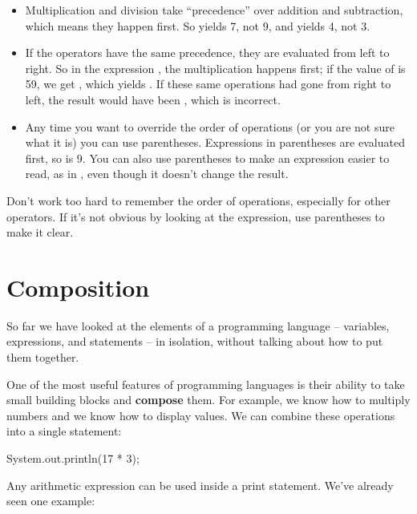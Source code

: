 \begin{itemize}

\item Multiplication and division take ``precedence'' over addition and subtraction, which means they happen first.
So  yields 7, not 9, and  yields 4, not 3.

\item If the operators have the same precedence, they are evaluated from left to right.
So in the expression , the multiplication happens first; if the value of  is 59, we get , which yields .
If these same operations had gone from right to left, the result would have been , which is incorrect.

\item Any time you want to override the order of operations (or you are not sure what it is) you can use parentheses.
Expressions in parentheses are evaluated first, so  is 9.
You can also use parentheses to make an expression easier to read, as in , even though it doesn't change the result.

\end{itemize}

Don't work too hard to remember the order of operations, especially for other operators.
If it's not obvious by looking at the expression, use parentheses to make it clear.


\section{Composition}


So far we have looked at the elements of a programming language -- variables, expressions, and statements -- in isolation, without talking about how to put them together.

One of the most useful features of programming languages is their ability to take small building blocks and {\bf compose} them.
For example, we know how to multiply numbers and we know how to display values.
We can combine these operations into a single statement:

\begin{code}
System.out.println(17 * 3);
\end{code}

Any arithmetic expression can be used inside a print statement.
We've already seen one example:

